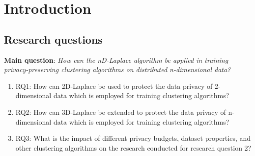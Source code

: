 \chapter{Introduction}

\section{Research questions}
\textbf{Main question}: \newline
\textit{How can the nD-Laplace algorithm be applied in training privacy-preserving clustering algorithms on distributed n-dimensional data?}


\begin{enumerate}
  \item RQ1: How can 2D-Laplace be used to protect the data privacy of 2-dimensional data which is employed for training clustering algorithms?
  \item RQ2: How can 3D-Laplace be extended to protect the data privacy of n-dimensional data which is employed for training clustering algorithms?
  \item RQ3: What is the impact of different privacy budgets, dataset properties, and other clustering algorithms on the research conducted for research question 2?
\end{enumerate}